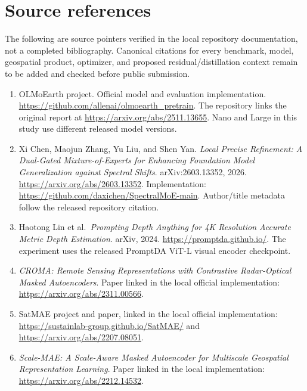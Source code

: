\documentclass[
  10pt,
  english,
]{article}
\providecommand{\tightlist}{%
  \setlength{\itemsep}{0pt}\setlength{\parskip}{0pt}}
\begin{document}
\hypertarget{source-references}{%
\section{Source references}\label{source-references}}

The following are source pointers verified in the local repository
documentation, not a completed bibliography. Canonical citations for
every benchmark, model, geospatial product, optimizer, and proposed
residual/distillation context remain to be added and checked before
public submission.

\begin{enumerate}
\def\labelenumi{\arabic{enumi}.}
\tightlist
\item
  OLMoEarth project. Official model and evaluation implementation.
  \url{https://github.com/allenai/olmoearth_pretrain}. The repository
  links the original report at \url{https://arxiv.org/abs/2511.13655}.
  Nano and Large in this study use different released model versions.
\item
  Xi Chen, Maojun Zhang, Yu Liu, and Shen Yan. \emph{Local Precise
  Refinement: A Dual-Gated Mixture-of-Experts for Enhancing Foundation
  Model Generalization against Spectral Shifts}. arXiv:2603.13352, 2026.
  \url{https://arxiv.org/abs/2603.13352}. Implementation:
  \url{https://github.com/daxichen/SpectralMoE-main}. Author/title
  metadata follow the released repository citation.
\item
  Haotong Lin et al.~\emph{Prompting Depth Anything for 4K Resolution
  Accurate Metric Depth Estimation}. arXiv, 2024.
  \url{https://promptda.github.io/}. The experiment uses the released
  PromptDA ViT-L visual encoder checkpoint.
\item
  \emph{CROMA: Remote Sensing Representations with Contrastive
  Radar-Optical Masked Autoencoders}. Paper linked in the local official
  implementation: \url{https://arxiv.org/abs/2311.00566}.
\item
  SatMAE project and paper, linked in the local official implementation:
  \url{https://sustainlab-group.github.io/SatMAE/} and
  \url{https://arxiv.org/abs/2207.08051}.
\item
  \emph{Scale-MAE: A Scale-Aware Masked Autoencoder for Multiscale
  Geospatial Representation Learning}. Paper linked in the local
  implementation: \url{https://arxiv.org/abs/2212.14532}.
\end{enumerate}
\end{document}
